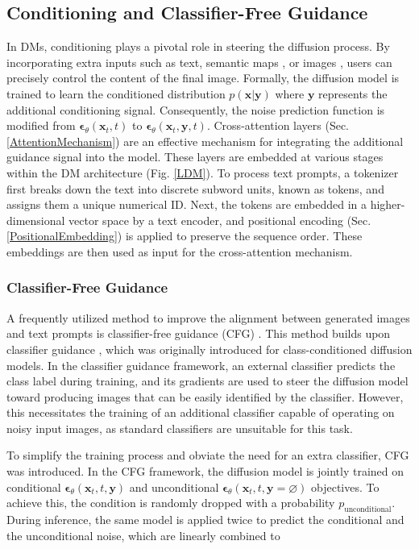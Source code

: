 \subsection{Conditioning and Classifier-Free Guidance}
\label{ConditioningOfDiffusionModels}
In \gls{DM}s, conditioning plays a pivotal role in steering the diffusion process. By incorporating extra inputs such as text, semantic maps \cite{ControlNet}, or images \cite{tan2025ominicontrol}, users can precisely control the content of the final image. Formally, the diffusion model is trained to learn the conditioned distribution $p(\mathbf{x}|\mathbf{y})$ where $\mathbf{y}$ represents the additional conditioning signal. Consequently, the noise prediction function is modified from $\boldsymbol{\epsilon}_\theta(\mathbf{x}_t, t)$  to $\boldsymbol{\epsilon}_\theta(\mathbf{x}_t, \mathbf{y},t)$.  Cross-attention layers (Sec. \ref{AttentionMechanism}) \cite{AttentionIsAllYouNeed} are an effective mechanism for integrating the additional guidance signal into the model. These layers are embedded at various stages within the \gls{DM} architecture (Fig. \ref{LDM}). To process text prompts, a tokenizer first breaks down the text into discrete subword units, known as tokens, and assigns them a unique numerical ID. Next, the tokens are embedded in a higher-dimensional vector space by a text encoder, and positional encoding (Sec. \ref{PositionalEmbedding}) is applied to preserve the sequence order. These embeddings are then used as input for the cross-attention mechanism. 

\subsubsection{Classifier-Free Guidance}
A frequently utilized method to improve the alignment between generated images and text prompts is classifier-free guidance (\gls{CFG}) \cite{CFG}. This method builds upon classifier guidance \cite{CG}, which was originally introduced for class-conditioned diffusion models. In the classifier guidance framework, an external classifier predicts the class label during training, and its gradients are used to steer the diffusion model toward producing images that can be easily identified by the classifier. However, this necessitates the training of an additional classifier capable of operating on noisy input images, as standard classifiers are unsuitable for this task. 

To simplify the training process and obviate the need for an extra classifier, \gls{CFG} was introduced. In the \gls{CFG} framework, the diffusion model is jointly trained on conditional $\boldsymbol{\epsilon}_\theta(\mathbf{x}_t, t,\mathbf{y} )$
and unconditional $\boldsymbol{\epsilon}_\theta(\mathbf{x}_t, t,\mathbf{y} =\varnothing)$ objectives. To achieve this, the condition is randomly dropped with a probability $p_\text{unconditional}$. During inference, the same model is applied twice to predict the conditional and the unconditional noise, which are linearly combined to

